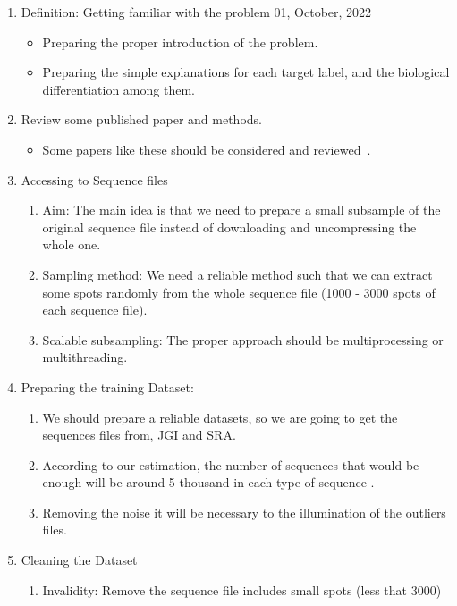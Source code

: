 \documentclass[a4paper]{article}
\newcommand{\deadline}[1]{{\color{blue} \hfill{#1} }}
\begin{document}
    \begin{enumerate}
        \item Definition: Getting familiar with the problem \deadline{01, October, 2022}
        \begin{itemize}
            \item Preparing the proper introduction of the problem.
            \item Preparing the simple explanations for each target label, and the biological differentiation among them.
        \end{itemize}
        \item Review some published paper and methods.
        \begin{itemize}
            \item Some papers like these should be considered and reviewed~\cite[]{RF102}.
        \end{itemize}
        \item Accessing to Sequence files
        \begin{enumerate}
            \item Aim: The main idea is that we need to prepare a small subsample of the original sequence file instead of downloading and uncompressing the whole one.
            \item Sampling method: We need a reliable method such that we can extract some spots randomly from the whole sequence file (1000 - 3000 spots of each sequence file).
            \item Scalable subsampling: The proper approach should be multiprocessing or multithreading.
        \end{enumerate}
        \item Preparing the training Dataset:
        \begin{enumerate}
            \item We should prepare a reliable datasets, so we are going to get the sequences files from, JGI and SRA.\@
            \item According to our estimation, the number of sequences that would be enough will be around 5 thousand in each type of sequence .
            \item Removing the noise it will be necessary to the illumination of the outliers files.
        \end{enumerate}
        \item Cleaning the Dataset
        \begin{enumerate}
            \item Invalidity: Remove the sequence file includes small spots (less that 3000)

\end{enumerate}
\end{enumerate}
\end{document}
